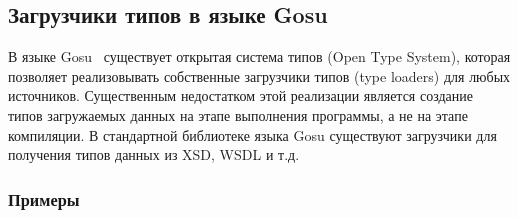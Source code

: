 \subsection{Загрузчики типов в языке Gosu}\label{gosu-type-loaders}
В языке Gosu~\cite{gosuguide} существует открытая система типов (Open Type System), которая позволяет реализовывать собственные загрузчики типов (type loaders) для любых источников.
Существенным недостатком этой реализации является создание типов загружаемых данных на этапе выполнения программы, а не на этапе компиляции.
В стандартной библиотеке языка Gosu существуют загрузчики для получения типов данных из XSD, WSDL и т.д.

\subsubsection{Примеры}

